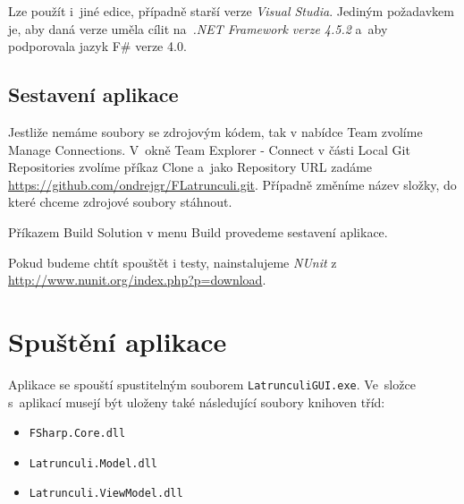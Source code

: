 \documentclass[12pt]{article}
\begin{document}
Lze použít i~jiné edice, případně starší verze \emph{Visual Studia}. Jediným požadavkem je, aby daná verze uměla cílit na~\emph{.NET Framework verze 4.5.2} a~aby podporovala jazyk F\# verze 4.0.
\subsection{Sestavení aplikace}
Jestliže nemáme soubory se zdrojovým kódem, tak v nabídce Team zvolíme Manage Connections. V~okně Team Explorer - Connect v části Local Git Repositories zvolíme příkaz Clone a~jako Repository URL zadáme \url{https://github.com/ondrejgr/FLatrunculi.git}. Případně změníme název složky, do které chceme zdrojové soubory stáhnout.

Příkazem Build Solution v menu Build provedeme sestavení aplikace.

Pokud budeme chtít spouštět i testy, nainstalujeme \emph{NUnit} z \url{http://www.nunit.org/index.php?p=download}.

\section{Spuštění aplikace}
Aplikace se spouští spustitelným souborem \texttt{LatrunculiGUI.exe}. Ve~složce s~aplikací musejí být uloženy také následující soubory knihoven tříd:
	\begin{itemize}  
		\item \texttt{FSharp.Core.dll}
		\item \texttt{Latrunculi.Model.dll}
		\item \texttt{Latrunculi.ViewModel.dll}
	\end{itemize}
\end{document}
